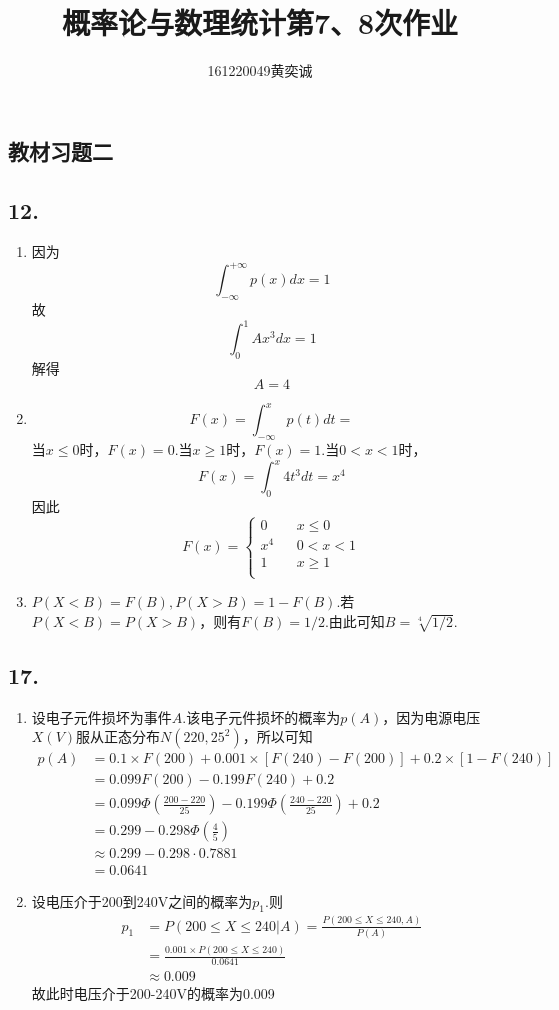 \documentclass[twocolumn]{article}
\begin{document}
	\begin{CJK}{UTF8}{gbsn}		
			\title{概率论与数理统计第7、8次作业}
			\author{161220049\quad 黄奕诚}
			\maketitle
			
			\section*{教材习题二}
				\subsection*{12.}
					\begin{enumerate}[(1)]
						\item 因为\[\int_{-\infty}^{+\infty}p(x)dx=1\]故\[\int_{0}^{1}Ax^3dx=1\]解得\[A=4\]
						\item \[F(x)=\int_{-\infty}^{x}p(t)dt=\]当$x\le0$时，$F(x)=0$.当$x\ge1$时，$F(x)=1$.当$0<x<1$时，\[F(x)=\int_{0}^{x}4t^3dt=x^4\]因此\begin{equation*}
						F(x)=\left\{
						\begin{array}{rcl}
						0 & & {x\le0}\\
						x^4 & & {0<x<1}\\
						1 & & {x\ge1}\\
						\end{array} \right.
						\end{equation*}
						\item $P(X<B)=F(B),P(X>B)=1-F(B)$.若$P(X<B)=P(X>B)$，则有$F(B)=1/2$.由此可知$B=\sqrt[4]{1/2}$.
					\end{enumerate}
				\subsection*{17.}
					\begin{enumerate}[(1)]
						\item 设电子元件损坏为事件$A$.该电子元件损坏的概率为$p(A)$，因为电源电压$X(V)$服从正态分布$N(220,25^2)$，所以可知\begin{align*}
							p(A) & = 0.1\times F(200) + 0.001\times [F(240)-F(200)]+0.2\times [1-F(240)] \\
							& = 0.099F(200)-0.199F(240)+0.2\\
							& = 0.099\Phi(\frac{200-220}{25})-0.199\Phi(\frac{240-220}{25})+0.2\\
							& = 0.299-0.298\Phi(\frac{4}{5})\\
							& \approx 0.299-0.298\cdot0.7881\\
							& = 0.0641
						\end{align*}
						\item 设电压介于200到240V之间的概率为$p_1$.则\begin{align*}
							p_1 & = P(200\le X\le 240|A)=\frac{P(200\le X\le 240, A)}{P(A)}\\
							& = \frac{0.001\times P(200\le X\le 240)}{0.0641}\\
							& \approx  0.009
						\end{align*}
						故此时电压介于200-240V的概率为0.009
					\end{enumerate}

\end{CJK}
\end{document}
